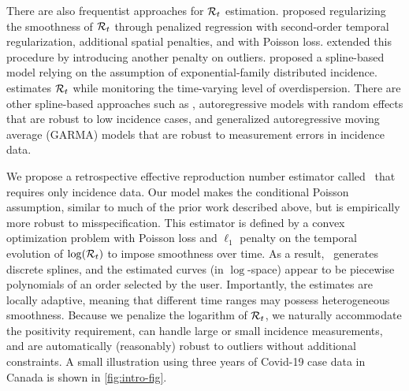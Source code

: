 There are also frequentist approaches for $\mathcal{R}_t$ estimation.
\citet{abry2020spatial} proposed regularizing the smoothness of $\mathcal{R}_t$
through penalized
regression with second-order temporal regularization, additional spatial
penalties, and with Poisson loss. \citet{pascal2022nonsmooth}
extended this procedure by introducing another penalty on outliers.
%
\cite{pircalabelu2023spline} proposed a spline-based model relying on the 
assumption of exponential-family distributed incidence. 
\cite{ho2023accounting} estimates $\mathcal{R}_t$ while monitoring the time-varying
level of overdispersion. 
%
There are other spline-based approaches such as
\cite{azmon2014estimation,gressani2021approximate},
autoregressive models with random effects \citep{jin2023epimix} that are robust
to low incidence cases, and generalized autoregressive moving average (GARMA)
models \citep{hettinger2023estimating} that are robust to measurement errors in
incidence data. 


We propose a retrospective effective reproduction number estimator
called \RtEstim\ that requires only incidence data. Our model makes the
conditional Poisson assumption, similar to much of the prior work described
above, but is empirically more robust to misspecification. This estimator is defined by a
convex optimization problem with Poisson loss and $\ell_1$ penalty on the
temporal evolution of $\log(\mathcal{R}_t)$ to impose smoothness over time. 
As a result, \RtEstim\ generates discrete splines, and the estimated curves (in
$\log$-space) appear to be piecewise polynomials of an order selected by the
user. Importantly, the estimates are locally adaptive, meaning that different
time ranges may possess heterogeneous smoothness. Because we penalize the
logarithm of $\mathcal{R}_t$, we naturally accommodate the positivity requirement, can
handle large or small incidence measurements, and are automatically (reasonably)
robust to outliers without additional constraints. A small illustration using
three years of Covid-19 case data in Canada is shown in \autoref{fig:intro-fig}.


